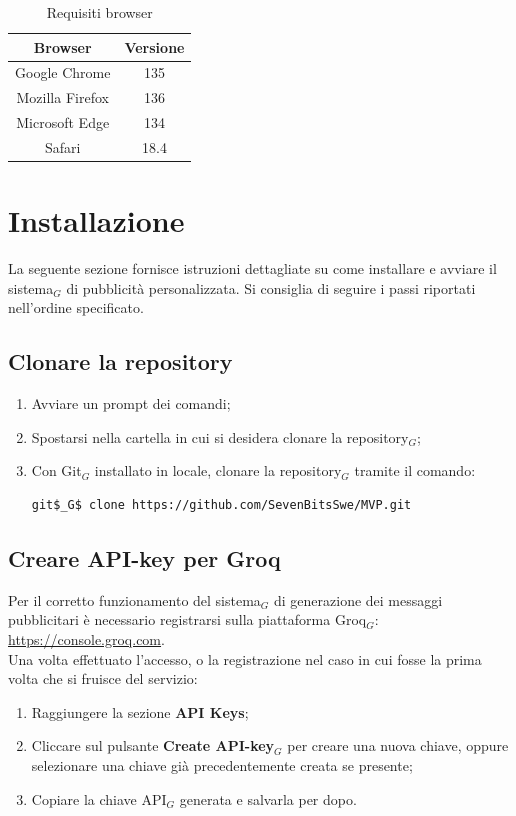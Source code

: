 \documentclass[10pt]{article}
\begin{document}
\begin{justify}
\begin{table}[H]
    \centering
    \begin{tabular}{|c|c|}
        \hline
        \rowcolor{gray!25}
        Browser & Versione \\
        \hline
        Google Chrome & 135\\
        \hline
        Mozilla Firefox & 136\\
        \hline
        Microsoft Edge & 134\\
        \hline
        Safari & 18.4\\
        \hline
    \end{tabular}
    \caption{Requisiti browser}
    \label{tab:requisiti_browser}
\end{table}


\newpage


\section{Installazione}
\label{sec:installazione}
La seguente sezione fornisce istruzioni dettagliate su come installare e avviare il sistema$_G$ di pubblicità personalizzata. Si consiglia di seguire i passi riportati nell'ordine specificato.

\subsection{Clonare la repository}
\begin{enumerate}
    \item Avviare un prompt dei comandi;
    \item Spostarsi nella cartella in cui si desidera clonare la repository$_G$;
    \item Con Git$_G$ installato in locale, clonare la repository$_G$ tramite il comando:
\begin{verbatim}
git$_G$ clone https://github.com/SevenBitsSwe/MVP.git
\end{verbatim}
\end{enumerate}

\subsection{Creare API-key per Groq}
Per il corretto funzionamento del sistema$_G$ di generazione dei messaggi pubblicitari è necessario registrarsi sulla piattaforma Groq$_G$: \url{https://console.groq.com}.\\
Una volta effettuato l'accesso, o la registrazione nel caso in cui fosse la prima volta che si fruisce del servizio:
\begin{enumerate}
    \item Raggiungere la sezione \textbf{API Keys};
    \item Cliccare sul pulsante \textbf{Create API-key$_G$} per creare una nuova chiave, oppure selezionare una chiave già precedentemente creata se presente;
    \item Copiare la chiave API$_G$ generata e salvarla per dopo.
\end{enumerate}


\end{justify}
\end{document}
